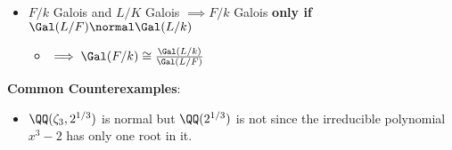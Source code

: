 \begin{itemize}
\tightlist
\item
  \(F/k\) Galois and \(L/K\) Galois \(\implies F/k\) Galois \textbf{only
  if} \(\Gal(L/F) \normal \Gal(L/k)\)

  \begin{itemize}
  \tightlist
  \item
    \(\implies \Gal(F/k) \cong \frac{\Gal(L/k)}{\Gal(L/F)}\)
  \end{itemize}
\end{itemize}

\begin{center}
\end{center}

\textbf{Common Counterexamples}:

\begin{itemize}
\tightlist
\item
  \(\QQ(\zeta_3, 2^{1/3})\) is normal but \(\QQ(2^{1/3})\) is not since
  the irreducible polynomial \(x^3 - 2\) has only one root in it.
\end{itemize}

